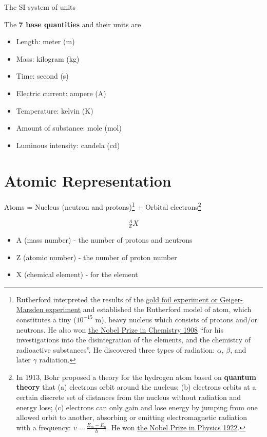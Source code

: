 \documentclass[]{book}
\providecommand{\tightlist}{%
  \setlength{\itemsep}{0pt}\setlength{\parskip}{0pt}}
\let\rmarkdownfootnote\footnote%
\def\footnote{\protect\rmarkdownfootnote}
\theoremstyle{definition}
\theoremstyle{definition}
\theoremstyle{definition}
\theoremstyle{remark}
\begin{document}
The SI system of units

The \textbf{7 base quantities} and their units are

\begin{itemize}
\tightlist
\item
  Length: meter (m)
\item
  Mass: kilogram (kg)
\item
  Time: second (s)
\item
  Electric current: ampere (A)
\item
  Temperature: kelvin (K)
\item
  Amount of substance: mole (mol)
\item
  Luminous intensity: candela (cd)
\end{itemize}

\section{Atomic Representation}\label{atomic-rep}

Atoms = Nucleus (neutron and protons)\footnote{Rutherford interpreted
  the results of the
  \href{https://en.wikipedia.org/wiki/Geiger\%E2\%80\%93Marsden_experiment}{gold
  foil experiment or Geiger-Marsden experiment} and established the
  Rutherford model of atom, which constitutes a tiny (\(10^{-15}\) m),
  heavy nucleus which consists of protons and/or neutrons. He also won
  \href{https://www.nobelprize.org/nobel_prizes/chemistry/laureates/1908/}{the
  Nobel Prize in Chemistry 1908} ``for his investigations into the
  disintegration of the elements, and the chemistry of radioactive
  substances''. He discovered three types of radiation: \(\alpha\),
  \(\beta\), and later \(\gamma\) radiation.} + Orbital
electrons\footnote{In 1913, Bohr proposed a theory for the hydrogen atom
  based on \textbf{quantum theory} that (a) electrons orbit around the
  nucleus; (b) electrons orbits at a certain discrete set of distances
  from the nucleus without radiation and energy loss; (c) electrons can
  only gain and lose energy by jumping from one allowed orbit to
  another, absorbing or emitting electromagnetic radiation with a
  frequency: \(v=\frac{E_m-E_n}{h}\). He won
  \href{https://www.nobelprize.org/nobel_prizes/physics/laureates/1922/}{the
  Nobel Prize in Physics 1922}.}

\[^A_ZX\]

\begin{itemize}
\tightlist
\item
  A (mass number) - the number of protons and neutrons
\item
  Z (atomic number) - the number of proton number
\item
  X (chemical element) - for the element
\end{itemize}
\end{document}
